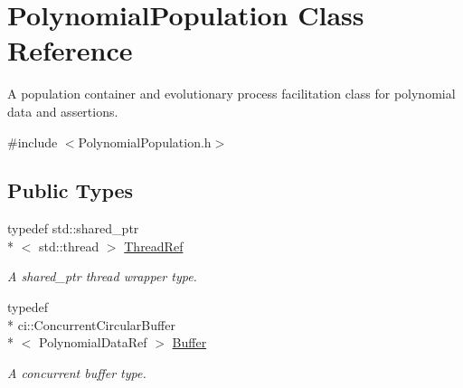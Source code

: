 \hypertarget{class_polynomial_population}{\section{Polynomial\-Population Class Reference}
\label{class_polynomial_population}
}


A population container and evolutionary process facilitation class for polynomial data and assertions.  




{\ttfamily \#include $<$Polynomial\-Population.\-h$>$}

\subsection*{Public Types}
\begin{DoxyCompactItemize}
\item 
\hypertarget{class_polynomial_population_a568edac365b311b32b0cd1615b75a961}{typedef std\-::shared\-\_\-ptr\\*
$<$ std\-::thread $>$ \hyperlink{class_polynomial_population_a568edac365b311b32b0cd1615b75a961}{Thread\-Ref}}\label{class_polynomial_population_a568edac365b311b32b0cd1615b75a961}

\begin{DoxyCompactList}\small\item\em A shared\-\_\-ptr thread wrapper type. \end{DoxyCompactList}\item 
\hypertarget{class_polynomial_population_a04e8d961feacdb2b80c3320c65c85d5b}{typedef \\*
ci\-::\-Concurrent\-Circular\-Buffer\\*
$<$ Polynomial\-Data\-Ref $>$ \hyperlink{class_polynomial_population_a04e8d961feacdb2b80c3320c65c85d5b}{Buffer}}\label{class_polynomial_population_a04e8d961feacdb2b80c3320c65c85d5b}

\begin{DoxyCompactList}\small\item\em A concurrent buffer type. \end{DoxyCompactList}\end{DoxyCompactItemize}
